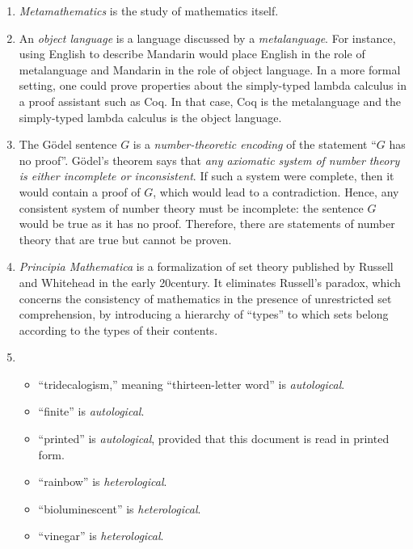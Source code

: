 \documentclass[11pt,letterpaper]{article}
\begin{document}
\begin{enumerate}
    \item
        \emph{Metamathematics} is the study of mathematics itself.

    \item
        An \emph{object language} is a language discussed by a
        \emph{metalanguage}.
        For instance, using English to describe Mandarin would place English in
        the role of metalanguage and Mandarin in the role of object language.
        In a more formal setting, one could prove properties about the
        simply-typed lambda calculus in a proof assistant such as Coq.
        In that case, Coq is the metalanguage and the simply-typed lambda
        calculus is the object language.

    \item
        The G\"odel sentence $G$ is a \emph{number-theoretic encoding} of the
        statement ``$G$ has no proof''.
        G\"odel's theorem says that \emph{any axiomatic system of number theory
        is either incomplete or inconsistent}.
        If such a system were complete, then it would contain a proof of $G$,
        which would lead to a contradiction.
        Hence, any consistent system of number theory must be incomplete: the
        sentence $G$ would be true as it has no proof.
        Therefore, there are statements of number theory that are true but
        cannot be proven.

    \item
        \emph{Principia Mathematica} is a formalization of set theory published
        by Russell and Whitehead in the early 20\th century.
        It eliminates Russell's paradox, which concerns the consistency of
        mathematics in the presence of unrestricted set comprehension, by
        introducing a hierarchy of ``types'' to which sets belong according to
        the types of their contents.

    \item
        \begin{itemize}
            \item
                ``tridecalogism,'' meaning ``thirteen-letter word'' is
                \emph{autological}.
            \item
                ``finite'' is \emph{autological}.
            \item
                ``printed'' is \emph{autological}, provided that this document
                is read in printed form.
            \item
                ``rainbow'' is \emph{heterological}.
            \item
                ``bioluminescent'' is \emph{heterological}.
            \item
                ``vinegar'' is \emph{heterological}.
        \end{itemize}
\end{enumerate}
\end{document}
